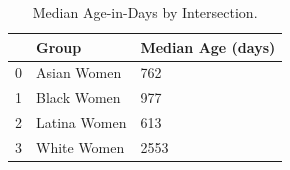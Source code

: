 \begin{table}[htbp]
\centering
\caption{Median Age-in-Days by Intersection.}
\label{tab:eda_age_days_by_group}
\begin{tabular}{lll}
\toprule
 & Group & Median Age (days) \\
\midrule
0 & Asian Women & 762 \\
1 & Black Women & 977 \\
2 & Latina Women & 613 \\
3 & White Women & 2553 \\
\bottomrule
\end{tabular}

\end{table}